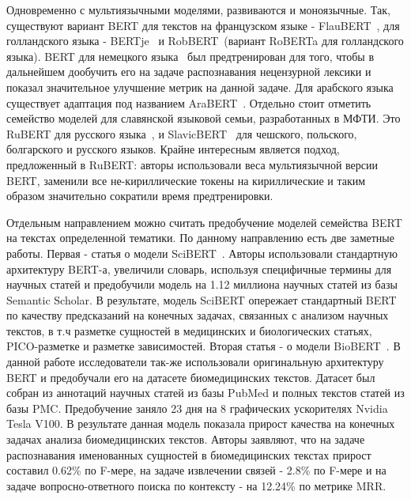 \par Одновременно с мультиязычными моделями, развиваются и моноязычные. Так, существуют вариант BERT для текстов на французском языке - FlauBERT~\cite{flaubert}, для голландского языка - BERTje~\cite{bertje} и RobBERT~\cite{robbert}(вариант RoBERTa для голландского языка). BERT для немецкого языка~\cite{germanbert} был предтренирован для того, чтобы в дальнейшем дообучить его на задаче распознавания нецензурной лексики и показал значительное улучшение метрик на данной задаче. Для арабского языка существует адаптация под названием AraBERT~\cite{arabert}. Отдельно стоит отметить семейство моделей для славянской языковой семьи, разработанных в МФТИ. Это RuBERT для русского языка~\cite{rubert}, и SlavicBERT~\cite{slavicbert} для чешского, польского, болгарского и русского языков. Крайне интересным является подход, предложенный в RuBERT: авторы использовали веса мультиязычной версии BERT, заменили все не-кириллические токены на кириллические и таким образом значительно сократили время предтренировки.

\par Отдельным направлением можно считать предобучение моделей семейства BERT на текстах определенной тематики. По данному направлению есть две заметные работы. Первая - статья о модели SciBERT~\cite{scibert}. Авторы использовали стандартную архитектуру BERT-а, увеличили словарь, используя специфичные термины для научных статей и предобучили модель на 1.12 миллиона научных статей из базы Semantic Scholar. В результате, модель SciBERT опережает стандартный BERT по качеству предсказаний на конечных задачах, связанных с анализом научных текстов, в т.ч разметке сущностей в медицинских и биологических статьях, PICO-разметке и разметке зависимостей. Вторая статья - о модели BioBERT~\cite{biobert}. В данной работе исследователи так-же использовали оригинальную архитектуру BERT и предобучали его на датасете биомедицинских текстов. Датасет был собран из аннотаций научных статей из базы PubMed и полных текстов статей из базы PMC. Предобучение заняло 23 дня на 8 графических ускорителях Nvidia Tesla V100. В результате данная модель показала прирост качества на конечных задачах анализа биомедицинских текстов. Авторы заявляют, что на задаче распознавания именованных сущностей в биомедицинских текстах прирост составил 0.62\% по F-мере, на задаче извлечении связей - 2.8\% по F-мере и на задаче вопросно-ответного поиска по контексту - на 12.24\% по метрике MRR.

